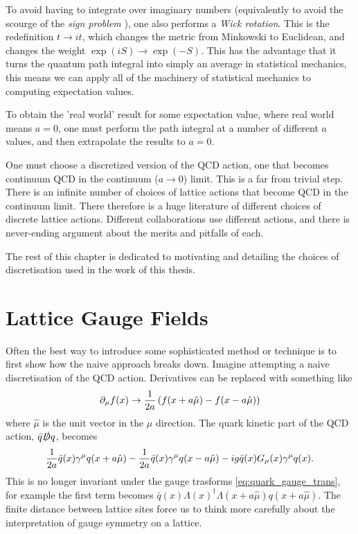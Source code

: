 To avoid having to integrate over imaginary numbers (equivalently to avoid the scourge of the {\it{sign problem}} \cite{deForcrand:2010ys}), one also performs a {\it{Wick rotation}}. This is the redefinition $t\to it$, which changes the metric from Minkowski to Euclidean, and changes the weight $\exp(iS) \to \exp(-S)$. This has the advantage that it turns the quantum path integral into simply an average in statistical mechanics, this means we can apply all of the machinery of statistical mechanics to computing expectation values.

To obtain the 'real world' result for some expectation value, where real world means $a=0$, one must perform the path integral at a number of different $a$ values, and then extrapolate the results to $a=0$.

One must choose a discretized version of the QCD action, one that becomes continuum QCD in the continuum ($a\to 0$) limit. This is a far from trivial step. There is an infinite number of choices of lattice actions that become QCD in the continuum limit. There therefore is a huge literature of different choices of discrete lattice actions. Different collaborations use different actions, and there is never-ending argument about the merits and pitfalls of each.

The rest of this chapter is dedicated to motivating and detailing the choices of discretisation used in the work of this thesis.

\section{Lattice Gauge Fields}
\label{sec:gaugefields}

Often the best way to introduce some sophisticated method or technique is to first show how the naive approach breaks down. Imagine attempting a naive discretisation of the QCD action. Derivatives can be replaced with something like
\begin{align}
  \partial_{\mu}f(x) \to {1\over 2a} \left( f(x+a\hat{\mu}) - f(x-a\hat{\mu}) \right)
\end{align}
where $\hat{\mu}$ is the unit vector in the $\mu$ direction. The quark kinetic part of the QCD action, $\bar{q}\slashed{D}q$, becomes
\begin{align}
  {1\over 2a} \bar{q}(x)\gamma^{\mu}q(x+a\hat{\mu}) - {1\over 2a} \bar{q}(x)\gamma^{\mu}q(x-a\hat{\mu}) - ig\bar{q}(x)G_{\mu}(x)\gamma^{\mu} q(x).
\end{align}
This is no longer invariant under the gauge trasforms \eqref{eq:quark_gauge_trans}, for example the first term becomes $\bar{q}(x)\Lambda(x)^{\dagger} \Lambda(x+a\hat{\mu}) q(x+a\hat{\mu})$. The finite distance between lattice sites force us to think more carefully about the interpretation of gauge symmetry on a lattice.

